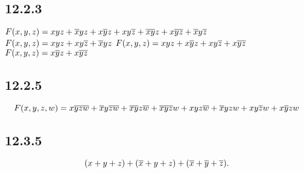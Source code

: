 \documentclass[12pt,titlepage]{extarticle}
\begin{document}
\subsection*{12.2.3}
\begin{tasks}
    \task $F(x,y,z) = xyz + \overline{x} y z + x \overline{y} z + x y \overline{z} + \overline{x} \overline{y} z + x \overline{y} \overline{z} + \overline{x} y \overline{z}$
    \task $F(x,y,z) = xyz + xy\overline{z} + \overline{x} yz $
    \task $F(x,y,z) = xyz + x\overline{y}z + xy\overline{z} + x\overline{y}\overline{z} $
    \task $F(x,y,z) = x \overline{y} z + x \overline{y} \overline{z} $
\end{tasks}

\subsection*{12.2.5}
\[
    F(x,y,z,w) = 
    {x} \overline{y} \overline{z} \overline{w} + 
    \overline{x} {y} \overline{z} \overline{w} + 
    \overline{x} \overline{y} {z} \overline{w} + 
    \overline{x} \overline{y} \overline{z} {w} + 
    {x} {y} {z} \overline{w} + 
    \overline{x} {y} {z} {w} + 
    {x} {y} \overline{z} {w} + 
    {x} \overline{y} {z} {w}
\]

\subsection*{12.3.5}
\[
    (x+y+z) + (\overline{x} + y + z) + (\overline{x} + \overline{y} + \overline{z})
.\]
\end{document}
